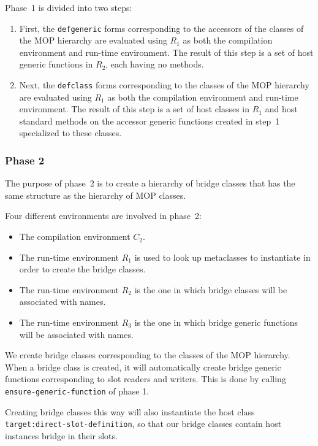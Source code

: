 Phase~1 is divided into two steps:

\begin{enumerate}
\item First, the \texttt{defgeneric} forms corresponding to the
  accessors of the classes of the MOP hierarchy are evaluated using
  $R_1$ as both the compilation environment and run-time environment.
  The result of this step is a set of host generic functions in $R_2$,
  each having no methods.
\item Next, the \texttt{defclass} forms corresponding to the classes
  of the MOP hierarchy are evaluated using $R_1$ as both the
  compilation environment and run-time environment.  The result of
  this step is a set of host classes in $R_1$ and host standard
  methods on the accessor generic functions created in step~1
  specialized to these classes.
\end{enumerate}

\subsubsection{Phase 2}

The purpose of phase~2 is to create a hierarchy of bridge classes that
has the same structure as the hierarchy of MOP classes.

Four different environments are involved in phase~2:

\begin{itemize}
\item The compilation environment $C_2$.
\item The run-time environment $R_1$ is used to look up metaclasses to
  instantiate in order to create the bridge classes.
\item The run-time environment $R_2$ is the one in which bridge
  classes will be associated with names.
\item The run-time environment $R_3$ is the one in which bridge
  generic functions will be associated with names.
\end{itemize}

We create bridge classes corresponding to the classes of the MOP
hierarchy.  When a bridge class is created, it will automatically
create bridge generic functions corresponding to slot readers and
writers.  This is done by calling \texttt{ensure-generic-function} of
phase 1.

Creating bridge classes this way will also instantiate the host class
\texttt{target:direct-slot-definition}, so that our bridge classes
contain host instances bridge in their slots. 

